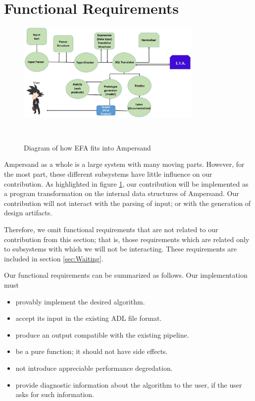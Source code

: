 \documentclass[12pt]{report}
\begin{document}
\section{Functional Requirements}\label{sec:Functional}
\begin{figure}[!htb]
	\centering
	\includegraphics[width=0.8\textwidth]{../figures/functional}
	\caption{Diagram of how EFA fits into Ampersand}~\label{fig:figure2}
\end{figure}

Ampersand as a whole is a large system with many moving parts. However, for the
most part, these different subsystems have little influence on our 
contribution. As highlighted in figure \ref{fig:figure2}, our contribution will 
be implemented as a program transformation on the internal data structures of 
Ampersand. Our contribution will not interact with the parsing of input; or 
with the generation of design artifacts.
 
Therefore, we omit functional requirements that are not related to our
contribution from this section; that is, those requirements which are related
only to subsystems with which we will not be interacting. These requirements are
included in section \ref{sec:Waiting}. 

Our functional requirements can be summarized as follows. Our implementation must
\begin{itemize}
\item provably implement the desired algorithm.
\item accept its input in the existing ADL file format.
\item produce an output compatible with the existing pipeline. 
\item be a pure function; it should not have side effects.  
\item not introduce appreciable performance degredation. 
\item provide diagnostic information about the algorithm to
the user, if the user asks for such information.
\end{itemize}
\end{document}
